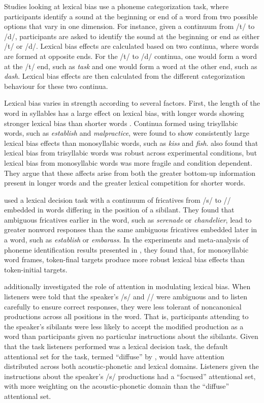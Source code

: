 Studies looking at lexical bias use a phoneme categorization task, where participants identify a sound at the beginning or end of a word from two possible options that vary in one dimension.  
For instance, given a continuum from /t/ to /d/, participants are asked to identify the sound at the beginning or end as either /t/ or /d/. 
Lexical bias effects are calculated based on two continua, where words are formed at opposite ends. 
For the /t/ to /d/ continua, one would form a word at the /t/ end, such as \emph{task} and one would form a word at the other end, such as \emph{dash}.  
Lexical bias effects are then calculated from the different categorization behaviour for these two continua.

Lexical bias varies in strength according to several factors.  
First, the length of the word in syllables has a large effect on lexical bias, with longer words showing stronger lexical bias than shorter words \citep{Pitt2006}.  
Continua formed using trisyllabic words, such as \emph{establish} and \emph{malpractice}, were found to show consistently large lexical bias effects than monosyllabic words, such as \emph{kiss} and \emph{fish}.  
\citet{Pitt2006} also found that lexical bias from trisyllabic words was robust across experimental conditions, but lexical bias from monosyllabic words was more fragile and condition dependent.  They argue that these affects arise from both the greater bottom-up information present in longer words and the greater lexical competition for shorter words.

\citet{Pitt2012} used a lexical decision task with a continuum of fricatives from /s/ to /\textesh/ embedded in words differing in the position of a sibilant.  
They found that ambiguous fricatives earlier in the word, such as \emph{serenade} or \emph{chandelier}, lead to greater nonword responses than the same ambiguous fricatives embedded later in a word, such as \emph{establish} or \emph{embarass}.  
In the experiments and meta-analysis of phoneme identification results presented in \citet{Pitt1993}, they found that, for monosyllabic word frames, token-final targets produce more robust lexical bias effects than token-initial targets.

\citet{Pitt2012} additionally investigated the role of attention in modulating lexical bias.  
When listeners were told that the speaker's /s/ and /\textesh/ were ambiguous and to listen carefully to ensure correct responses, they were less tolerant of noncanonical productions across all positions in the word.  
That is, participants attending to the speaker's sibilants were less likely to accept the modified production as a word than participants given no particular instructions about the sibilants.
Given that the task listeners performed was a lexical decision task, the default attentional set for the task, termed ``diffuse'' by \citet{Pitt2012}, would have attention distributed across both acoustic-phonetic and lexical domains.  Listeners given the instructions about the speaker's /s/ productions had a ``focused'' attentional set, with more weighting on the acoustic-phonetic domain than the ``diffuse'' attentional set.


